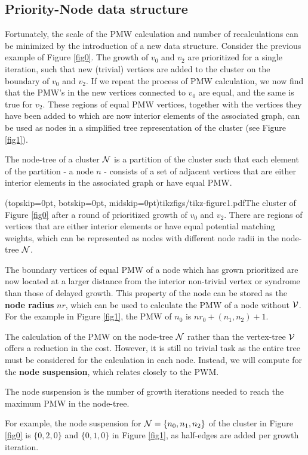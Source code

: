 \subsection{Priority-Node data structure}\label{sec:nodeset}

Fortunately, the scale of the PMW calculation and number of recalculations can be minimized by the introduction of a new data structure. 
Consider the previous example of Figure \ref{fig0}. The growth of $v_0$ and $v_2$ are prioritized for a single iteration, such that new (trivial) vertices are added to the cluster on the boundary of $v_0$ and $v_2$. If we repeat the process of PMW calculation, we now find that the PMW's in the new vertices connected to $v_0$ are equal, and the same is true for $v_2$. These regions of equal PMW vertices, together with the vertices they have been added to which are now interior elements of the associated graph, can be used as nodes in a simplified tree representation of the cluster (see Figure \ref{fig1}). 

\begin{definition}
  The node-tree of a cluster $\mathcal{N}$ is a partition of the cluster such that each element of the partition - a node $n$ - consists of a set of adjacent vertices that are either interior elements in the associated graph or have equal PMW. 
\end{definition}

\Figure[htb](topskip=0pt, botskip=0pt, midskip=0pt){tikzfigs/tikz-figure1.pdf}{The cluster of Figure \ref{fig0} after a round of prioritized growth of $v_0$ and $v_2$. There are regions of vertices that are either interior elements or have equal potential matching weights, which can be represented as nodes with different node radii in the node-tree $\mathcal{N}$. \label{fig1}}

The boundary vertices of equal PMW of a node which has grown prioritized are now located at a larger distance from the interior non-trivial vertex or syndrome than those of delayed growth. This property of the node can be stored as the \textbf{node radius} $nr$, which can be used to calculate the PMW of a node without $\mathcal{V}$. For the example in Figure \ref{fig1}, the PMW of $n_0$ is $nr_0 + (n_1, n_2) + 1$.

The calculation of the PMW on the node-tree $\mathcal{N}$ rather than the vertex-tree $\mathcal{V}$ offers a reduction in the cost. However, it is still no trivial task as the entire tree must be considered for the calculation in each node. Instead, we will compute for the \textbf{node suspension}, which relates closely to the PWM. 
\begin{definition}
  The node suspension is the number of growth iterations needed to reach the maximum PMW in the node-tree. 
\end{definition}
For example, the node suspension for $\mathcal{N} = \{n_0, n_1, n_2\}$ of the cluster in Figure \ref{fig0} is $\{0, 2, 0\}$ and $\{0, 1, 0\}$ in Figure \ref{fig1}, as half-edges are added per growth iteration. 

